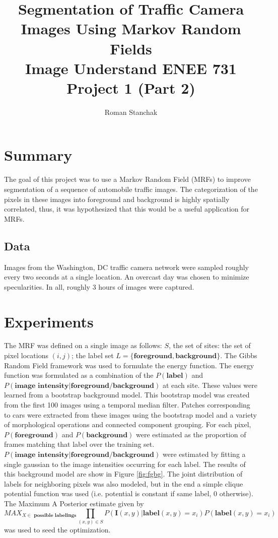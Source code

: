 \documentclass{article}
\title{ Segmentation of Traffic Camera Images Using Markov Random Fields\\ 
Image Understand ENEE 731\\
Project 1 (Part 2)}
\author{ Roman Stanchak }
\begin{document}
\maketitle
\section{Summary}
The goal of this project was to use a Markov Random Field (MRFs) to improve segmentation of 
a sequence of automobile traffic images.  The categorization of the pixels in these images
into foreground and background is highly spatially correlated, thus, it was hypothesized that
this would be a useful application for MRFs.  

\subsection{Data}
Images from the Washington, DC traffic camera network were sampled roughly every two seconds at a single location.  An overcast day was chosen to minimize specularities.  In all, roughly 3 hours of images were captured.  \\

\section{Experiments}
The MRF was defined on a single image as follows:  $S$, the set of sites: the set of pixel locations $(i,j)$; the label set $L=\{\textbf{foreground},\textbf{background}\}$.  The Gibbs Random Field framework was used to formulate the energy function.  The energy function was formulated as a combination of the $P(\textbf{label})$ and $P(\textbf{image              intensity}|\textbf{foreground/background})$ at each site.  These values were learned from a bootstrap background model.  This bootstrap model was created from the first 100 images using a temporal median filter.  Patches corresponding to cars were extracted from these
images using the bootstrap model and a variety of morphological operations and connected component grouping.  For each pixel, $P(\textbf{foreground})$ and $P(\textbf{background})$ were estimated as the proportion of frames matching that label over the training set.  $P(\textbf{image intensity}|\textbf{foreground/background})$ were estimated by fitting a single gaussian to the 
image intensities occurring for each label. The results of this background model are show in Figure \ref{fig:fgbg}.  The joint distribution of labels for neighboring pixels was also modeled, but
in the end a simple clique potential function was used (i.e. potential is constant if same label, 0 otherwise).   The Maximum A Posterior estimate given by
$$MAX_{X \in\textbf{ possible labelings}} \prod_{(x,y)\in S} P(\mathbf{I}(x,y)|\textbf{label}(x,y)=x_i)P(\textbf{label}(x,y)=x_i)$$
was used to seed the optimization.
\end{document}
